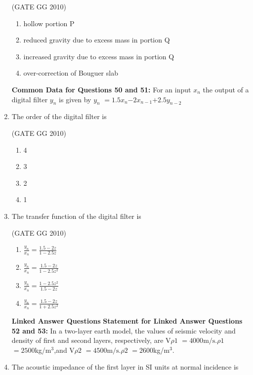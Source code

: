 \documentclass[journal]{IEEEtran}
\begin{document}
\begin{enumerate}[start=26]
\hfill (GATE GG 2010) 

\begin{enumerate}
    \item  hollow portion P
\item  reduced gravity due to excess mass in portion Q
\item  increased gravity due to excess mass in portion Q
\item  over-correction of Bouguer slab

\end{enumerate}
\textbf{Common Data for Questions 50 and 51:}
For an input $x_n$ the output of a digital filter $y_n$ is given by $y_n$ $=1.5$$x_n$$-2$$x_{n-1}$$+     2.5$$y_{n-2}$
\item The order of the digital filter is

\hfill (GATE GG 2010) 
\begin{multicols}{4}

\begin{enumerate}
    \item  4
    \item 3
\item 2
\item 1 
\end{enumerate}
\end{multicols}

\item The transfer function of the digital filter is

\hfill (GATE GG 2010) 
\begin{multicols}{2}

\begin{enumerate}
    \item $\frac{y_n}{x_n}=\frac{1.5-2z}{1-2.5z}$
    \vspace{0.3cm}
    \item $\frac{y_n}{x_n}=\frac{1.5-2z}{1-2.5z^2}$
    \vspace{0.3cm}
    \item  $\frac{y_n}{x_n}=\frac{1-2.5z^2}{1.5-2z}$
    \vspace{0.3cm}
    \item $\frac{y_n}{x_n}=\frac{1.5-2z}{1+2.5z^2}$
\end{enumerate}
\end{multicols}

\vspace{0.3cm}
\textbf{Linked Answer Questions}
\textbf{Statement for Linked Answer Questions 52 and 53:}
In a two-layer earth model, the values of seismic velocity and density of first and second layers, respectively, are V$\rho 1$ $= 4000 \text{m/s}$.$\rho 1$ $=2500$kg/m$^3$,and  V$\rho 2$ $= 4500 \text{m/s}$.$\rho 2$ $=2600$kg/m$^3$.
\item The acoustic impedance of the first layer in SI units at normal incidence is


\end{enumerate}
\end{document}
